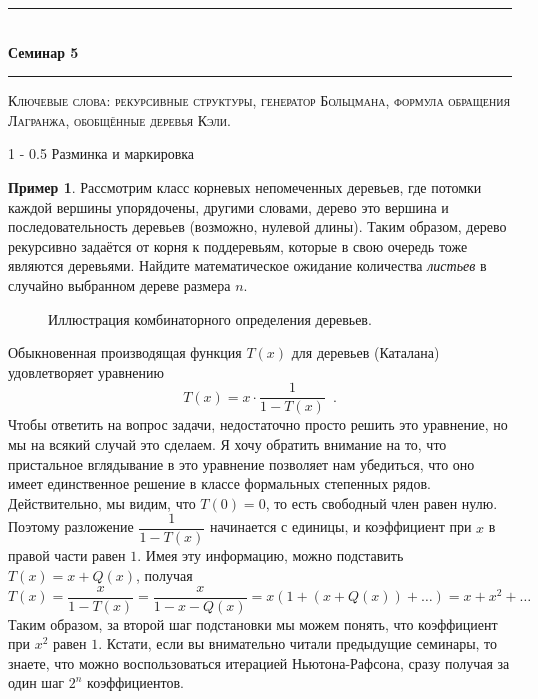 \documentclass[a5paper]{article}
\makeatletter
\def \topic {Семинар 5}
\theoremstyle{definition}
\newtheorem{example}{Пример}
\renewcommand{\section}{\@startsection
{section}%
{1}%
{\z@}%
{-\baselineskip}%
{0.5\baselineskip}%
{\centering\large\scshape}} %
\makeatother
\begin{document}
\begin{center}

\newcommand{\HRule}{\rule{\linewidth}{0.5mm}}
\HRule \\[0.2cm]
{ \Large \bfseries \topic} %
\HRule

\end{center}

\textsc{Ключевые слова: рекурсивные 
структуры, генератор Больцмана, формула обращения Лагранжа, обобщённые деревья Кэли.}

\section{Разминка и маркировка}
\begin{example}
    Рассмотрим класс корневых непомеченных деревьев, где потомки каждой вершины
упорядочены, другими словами, дерево это вершина и последовательность деревьев
(возможно, нулевой длины). Таким образом, дерево рекурсивно задаётся от корня к
поддеревьям, которые в свою очередь тоже являются деревьями.
Найдите математическое ожидание количества \textit{листьев} в случайно выбранном
дереве размера \( n \).
\end{example}
\begin{figure}[hbt]
\centering
{}
\caption{\label{fig:tree:specification}
Иллюстрация комбинаторного определения деревьев.}
\end{figure}
Обыкновенная производящая функция \( T(x) \) для деревьев (Каталана)
удовлетворяет уравнению
\begin{equation}
    T(x) = x \cdot \dfrac{1}{1- T(x)}
    \enspace .
\end{equation}
Чтобы ответить на вопрос задачи, недостаточно просто решить это уравнение, но мы
на всякий случай это сделаем. Я хочу обратить внимание на то, что пристальное
вглядывание в это уравнение позволяет нам убедиться, что оно имеет единственное
решение в классе формальных степенных рядов. Действительно, мы видим, что \( T(0) =
0 \), то есть свободный член равен нулю. Поэтому разложение \( \dfrac{1}{1 -
  T(x)} \) начинается с единицы, и коэффициент при \( x \) в правой части равен
\( 1 \). Имея эту информацию, можно подставить \( T(x) = x + Q(x) \), получая
\begin{equation}
   T(x) = \dfrac{x}{1 - T(x)} = \dfrac{x}{1 - x - Q(x)} = 
    x (1 + (x + Q(x)) + \ldots) = x + x^2 + \ldots
\end{equation}
Таким образом, за второй шаг подстановки мы можем понять, что коэффициент при \(
x^2 \) равен \( 1 \). Кстати, если вы внимательно читали предыдущие семинары, то
знаете, что можно воспользоваться итерацией Ньютона-Рафсона, сразу получая за
один шаг \( 2^n \) коэффициентов.
\end{document}
